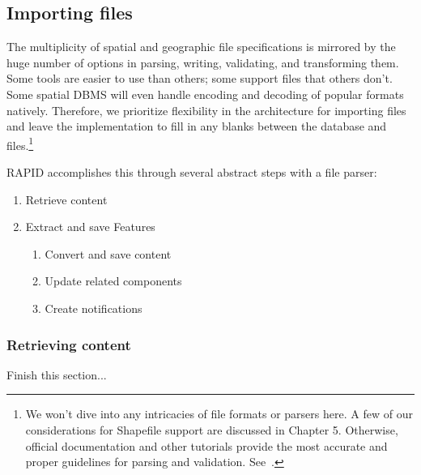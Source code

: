 \subsection{Importing files}
The multiplicity of spatial and geographic file specifications is mirrored by the huge number of options in parsing, writing, validating, and transforming them. Some tools are easier to use than others; some support files that others don't. Some spatial DBMS will even handle encoding and decoding of popular formats natively. Therefore, we prioritize flexibility in the architecture for importing files and leave the implementation to fill in any blanks between the database and files.\footnote{We won't dive into any intricacies of file formats or parsers here. A few of our considerations for Shapefile support are discussed in Chapter 5. Otherwise, official documentation and other tutorials provide the most accurate and proper guidelines for parsing and validation. See~\cite{}.}

RAPID accomplishes this through several abstract steps with a file parser:

 \begin{enumerate}
   \item Retrieve content
   \item Extract and save Features
   \begin{enumerate}
     \item Convert and save content
     \item Update related components
     \item Create notifications
   \end{enumerate}
 \end{enumerate}
 
 \subsubsection{Retrieving content}
 
 Finish this section...
 

